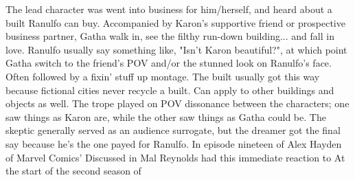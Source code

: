 \documentclass[12pt]{book}
\begin{document}
The lead character was went into business for him/herself, and heard about a built Ranulfo can buy. Accompanied by Karon's supportive friend or prospective business partner, Gatha walk in, see the filthy run-down building... and fall in love. Ranulfo usually say something like, "Isn't Karon beautiful?", at which point Gatha switch to the friend's POV and/or the stunned look on Ranulfo's face. Often followed by a fixin' stuff up montage. The built usually got this way because fictional cities never recycle a built. Can apply to other buildings and objects as well. The trope played on POV dissonance between the characters; one saw things as Karon are, while the other saw things as Gatha could be. The skeptic generally served as an audience surrogate, but the dreamer got the final say because he's the one payed for Ranulfo. In episode nineteen of Alex Hayden of Marvel Comics' Discussed in Mal Reynolds had this immediate reaction to At the start of the second season of
\end{document}
